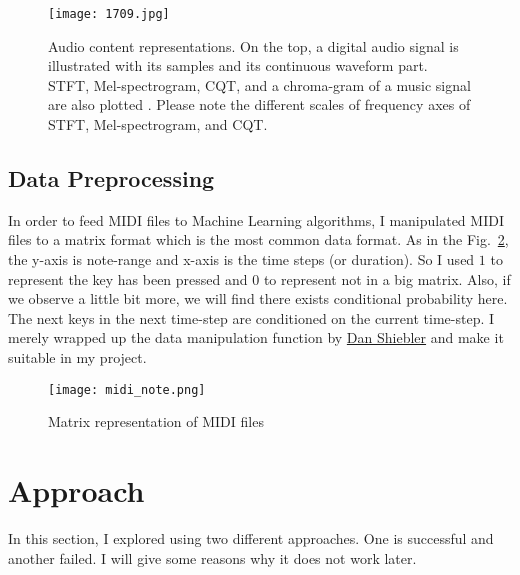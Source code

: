 \documentclass[journal, a4paper]{IEEEtran}
\begin{document}
	\begin{figure}[!hbt]
		\begin{center}
		\texttt{[image: 1709.jpg]}
		\caption{Audio content representations. On the top, a digital audio signal is illustrated with its samples and its continuous waveform part. STFT, Mel-spectrogram, CQT, and a chroma-gram of a music signal are also plotted . Please note the different scales of frequency axes of STFT, Mel-spectrogram,
and CQT.}
		\label{fig:repr}
		\end{center}
	\end{figure}	


\subsection{Data Preprocessing}
	In order to feed MIDI files to Machine Learning algorithms, I manipulated MIDI files to a matrix format which is the most common data format. As in the Fig.~\ref{fig:midi}, the y-axis is note-range and x-axis is the time steps (or duration). So I used $1$ to represent the key has been pressed and $0$ to represent not in a big matrix. Also, if we observe a little bit more, we will find there exists conditional probability here. The next keys in the next time-step are conditioned on the current time-step. I merely wrapped up the data manipulation function by \href{https://github.com/dshieble/Music_RNN_RBM/blob/master/midi_manipulation.py}{Dan Shiebler} and make it suitable in my project.

	\begin{figure}[!hbt]
		\begin{center}
		\texttt{[image: midi\_note.png]}
		\caption{Matrix representation of MIDI files}
		\label{fig:midi}
		\end{center}
	\end{figure}	

\section{Approach}
	In this section, I explored using two different approaches. One is successful and another failed. I will give some reasons why it does not work later.
\end{document}
